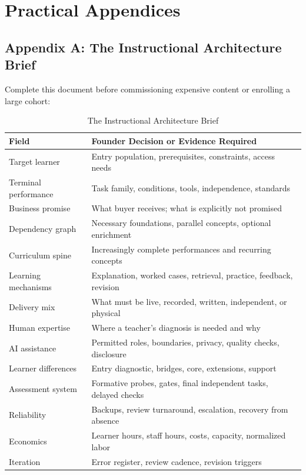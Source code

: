 \section*{Practical Appendices}

\subsection*{Appendix A: The Instructional Architecture Brief}

Complete this document before commissioning expensive content or enrolling a large cohort:

\begin{table}[t]
\centering
\small
\caption{The Instructional Architecture Brief}
\begin{tabularx}{\textwidth}{p{}X}
\toprule
\textbf{Field} & \textbf{Founder Decision or Evidence Required} \\
\midrule
Target learner & Entry population, prerequisites, constraints, access needs \\
Terminal performance & Task family, conditions, tools, independence, standards \\
Business promise & What buyer receives; what is explicitly not promised \\
Dependency graph & Necessary foundations, parallel concepts, optional enrichment \\
Curriculum spine & Increasingly complete performances and recurring concepts \\
Learning mechanisms & Explanation, worked cases, retrieval, practice, feedback, revision \\
Delivery mix & What must be live, recorded, written, independent, or physical \\
Human expertise & Where a teacher's diagnosis is needed and why \\
AI assistance & Permitted roles, boundaries, privacy, quality checks, disclosure \\
Learner differences & Entry diagnostic, bridges, core, extensions, support \\
Assessment system & Formative probes, gates, final independent tasks, delayed checks \\
Reliability & Backups, review turnaround, escalation, recovery from absence \\
Economics & Learner hours, staff hours, costs, capacity, normalized labor \\
Iteration & Error register, review cadence, revision triggers \\
\bottomrule
\end{tabularx}
\end{table}

